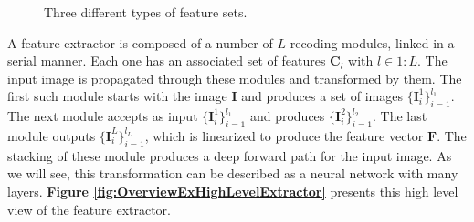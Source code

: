 \documentclass[12pt,a4paper,oneside,english]{UPBThesis}
\newcommand{\hcrange}[2]{\overline{{#1}\colon\!\!{#2}}}
\begin{document}
\begin{figure}
\centering
{}
\caption{Three different types of feature sets.}
\label{fig:OverviewExFeatures}
\end{figure}

A feature extractor is composed of a number of $L$ recoding modules, linked in a serial manner. Each one has an associated set of features $\textbf{C}_l$ with $l \in \hcrange{1}{L}$. The input image is propagated through these modules and transformed by them. The first such module starts with the image $\textbf{I}$ and produces a set of images $\{\textbf{I}_i^1\}_{i=1}^{l_1}$. The next module accepts as input $\{\textbf{I}_i^1\}_{i=1}^{l_1}$ and produces $\{\textbf{I}_i^2\}_{i=1}^{l_2}$. The last module outputs $\{\textbf{I}_i^L\}_{i=1}^{l_L}$, which is linearized to produce the feature vector $\mathbf{F}$. The stacking of these module produces a deep forward path for the input image. As we will see, this transformation can be described as a neural network with many layers. \textbf{Figure \ref{fig:OverviewExHighLevelExtractor}} presents this high level view of the feature extractor.
\end{document}
